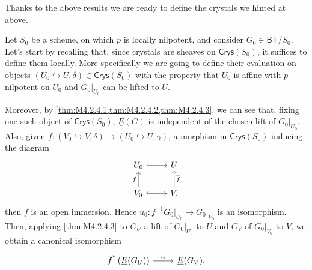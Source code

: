 \noindent
Thanks to the above results we are ready to define the crystals we hinted at above.


\begin{rem}\label{CrystalLocalPB}
	Let $S_0$ be a scheme, on which $p$ is locally
	nilpotent, and consider $G_0 \in \mathsf{BT}/S_0$.
	Let's start by recalling that, since crystals are sheaves on $\mathsf{Crys}(S_0)$,
	it suffices to define them locally.
	More specifically we are going to define their evaluation
	on objects $\left(U_0 \hookrightarrow U, \delta\right) \in \mathsf{Crys}(S_0)$
	with the property that $U_0$ is affine with $p$ nilpotent on $U_0$ and
	$\left.G_0\right|_{U_0}$ can be lifted to $U$.

	Moreover, by \cref{thm:M4.2.4.1,thm:M4.2.4.2,thm:M4.2.4.3},
	we can see that, fixing one such object of $\mathsf{Crys}(S_0)$,
	$\underline{E}(G)$ is independent of the chosen lift of $\left.G_0\right|_{U_0}$.
	Also, given 
	$f\colon \left(V_0 \hookrightarrow V, \delta\right) \to 
	\left(U_0 \hookrightarrow U, \gamma\right)$,
	a morphism in $\mathsf{Crys}(S_0)$
	inducing the diagram
	\begin{equation*}
	\begin{tikzcd}
		U_0 \arrow[r, "", hookrightarrow] &
		U\\
		V_0 \arrow[u, "f", rightarrow] 
		\arrow[r, "", hookrightarrow] &
		V \arrow[u, "\overline{f}"', rightarrow] 
	,\end{tikzcd}
	\end{equation*}
	then $f$ is an open immersion.
	Hence $u_0\colon f^{-1} \left.G_0\right|_{U_0} \to \left.G_0\right|_{V_0}$
	is an isomorphism. 
	Then, applying \cref{thm:M4.2.4.3} to $G_U$ a lift of
	$\left.G_0\right|_{U_0}$ to $U$ and $G_V$ of $\left.G_0\right|_{V_0}$ to $V$,
	we obtain a canonical isomorphism
	\begin{equation*}
	\begin{tikzcd}[row sep = 0ex
		,/tikz/column 1/.append style={anchor=base east}
		,/tikz/column 2/.append style={anchor=base west}]
		\overline{f}^* \left( \underline{E}(G_U) \right) \arrow[r, "\sim", rightarrow] &
		\underline{E}(G_V)
	.\end{tikzcd}
	\end{equation*} 
\end{rem}


